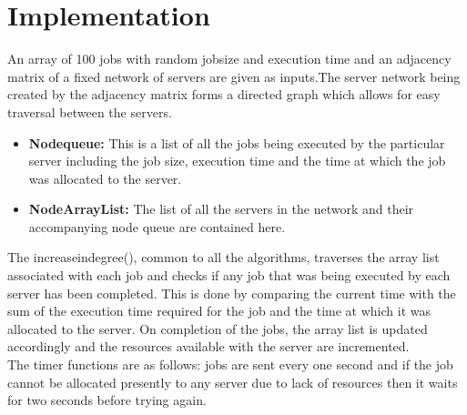 \section{Implementation}
An array of 100 jobs with random jobsize and execution time
and an adjacency matrix of a fixed network of servers are given
as inputs.The server network being created by the adjacency matrix forms a directed graph which
allows for easy traversal between the servers.
\begin{itemize}
\item \textbf{Nodequeue:} This is a list of all the jobs being executed by the particular server including the job size, execution time and the time at which
the job was allocated to the server.
\item \textbf{NodeArrayList:} The list of all the servers in the network and their
accompanying node queue are contained here.
\end{itemize}
The increaseindegree(), common to all the algorithms, traverses 
the array list associated with each job and checks if any job 
that was being executed by each server has been completed. 
This is done by comparing the current time with the sum of 
the execution time required for the job and the time at which it 
was allocated to the server. On completion of the jobs, the array list is updated accordingly and the resources available with the server are incremented.\\[0.2cm]
The timer functions are as follows: jobs are sent every one 
second and if the job cannot be allocated presently to any 
server due to lack of resources then it waits for two seconds before trying again.

